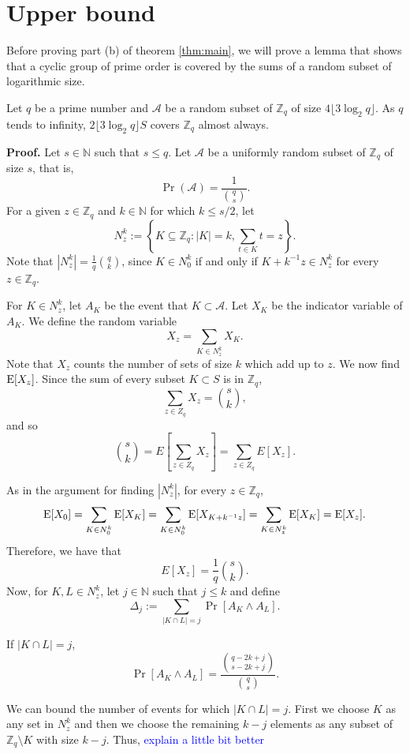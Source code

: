 \section{Upper bound}\label{sec:results:upperbound}
Before proving part (b) of theorem \ref{thm:main}, we will prove a lemma that shows that a cyclic group of prime order is covered by the sums of a random subset of logarithmic size.  
\begin{lemma}\label{lem:sumset}
    Let $q$ be a prime number and $\mathcal{A}$ be a random subset of $\mathbb{Z}_q$ of size $4\lfloor3\log_2 q\rfloor$. As $q$ tends to infinity, $2\lfloor3\log_2 q\rfloor S$ covers $\mathbb{Z}_q$ almost always. 
\end{lemma}

\textbf{Proof. } Let $s \in \mathbb{N}$ such that $s\leq q$. Let $\mathcal{A}$ be a uniformly random subset of $\mathbb{Z}_q$ of size $s$, that is, 
\[\Pr(\mathcal{A}) = \frac{1}{\binom{q}{s}}.\]
For a given $z \in \mathbb{Z}_q$ and $k \in \mathbb{N}$ for which $k \leq s/2$, let 
\[N_z^k := \left\{K \subseteq \mathbb{Z}_q: |K| = k, \sum_{t \in K} t = z\right\}.\]
Note that $|N_z^k| = \frac{1}{q}{\binom{q}{k}}$, since $K \in N_0^k$ if and only if $K + k^{-1}z \in N_z^k$ for every $z \in \mathbb{Z}_q$.\par
For $K \in N_z^k$, let $A_K$ be the event that $K \subset\mathcal{A}$. Let $X_K$ be the indicator variable of $A_K$.
We define the random variable 
\[X_z = \sum_{K \in N_z^k} X_K.\]
Note that $X_z$ counts the number of sets of size $k$ which add up to $z$. We now find $\mathrm{E}[X_z]$. Since the sum of every subset $K \subset S$ is in $\mathbb{Z}_q$,
\[\sum_{z \in Z_q} X_z = {\binom{s}{k}},\]
and so
\[\binom{s}{k} = E\left[\sum_{z \in Z_q} X_z\right] =  \sum_{z \in Z_q} E[X_z].\]\par
As in the argument for finding $|N_z^k|$, for every $z \in \mathbb{Z}_q$, 
\[\mathrm{E}[X_0] = \sum_{K \in N_0^k}\mathrm{E}[X_K] = \sum_{K \in N_0^k} \mathrm{E}[X_{K + k^{-1}z}] = \sum_{K \in N_z^k} \mathrm{E}[X_K] = \mathrm{E}[X_z].\]
Therefore, we have that
\begin{equation}\label{eq:upperbound:expected}
E[X_z] = \frac{1}{q} {\binom{s}{k}}.
\end{equation}
Now, for $K, L \in N_z^k$, let $j \in \mathbb{N}$ such that $j \leq k$ and define
\[\Delta_j := \sum_{|K \cap L| = j} \Pr[A_K \land A_L].\]
\par 
If $|K \cap L| = j$,
\[\Pr[A_K \land A_L] = \frac{\binom{q - 2k + j}{s - 2k + j}}{\binom{q}{s}}.\]
\par
We can bound the number of events for which $|K \cap L| = j$. First we choose $K$ as any set in $N_z^k$ and then we choose the remaining $k- j$ elements as any subset of $\mathbb{Z}_q \setminus K$ with size $k - j$. Thus, \textcolor{blue}{explain a little bit better}
